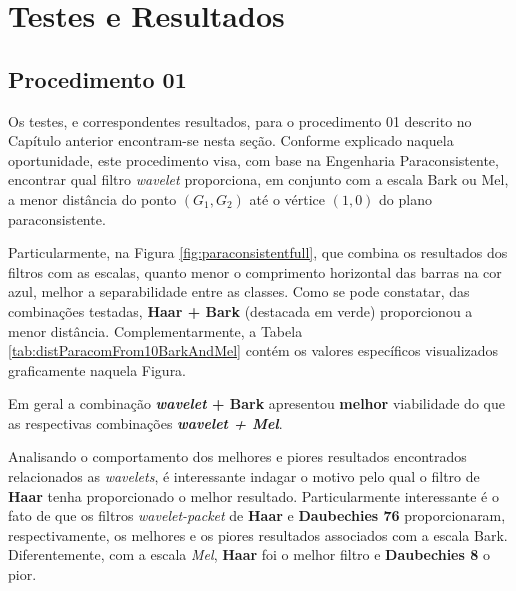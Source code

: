\chapter{Testes e Resultados} \label{chap:testsResults}
	\section{Procedimento 01}
	\label{chap:testsResults:sec:Experimento01}
	Os testes, e correspondentes resultados, para o procedimento 01 descrito no Capítulo anterior encontram-se nesta seção. Conforme explicado naquela oportunidade, este procedimento visa, com base na Engenharia Paraconsistente, encontrar qual filtro \textit{wavelet} proporciona, em conjunto com a escala Bark ou Mel, a menor distância do ponto $(G_1,G_2)$ até o vértice $(1,0)$ do plano paraconsistente.\\

	\par Particularmente, na Figura \ref{fig:paraconsistentfull}, que combina os resultados dos filtros com as escalas, quanto menor o comprimento horizontal das barras na cor azul, melhor a separabilidade entre as classes. Como se pode constatar, das combinações testadas, \textbf{Haar + Bark} (destacada em verde) proporcionou a menor distância. Complementarmente, a Tabela \ref{tab:distParacomFrom10BarkAndMel} contém os valores específicos visualizados graficamente naquela Figura.\\
	
	\par Em geral a combinação \textbf{\textit{wavelet} + Bark} apresentou \textbf{melhor} viabilidade do que as respectivas combinações \textbf{\textit{wavelet + Mel}}.\\

	

	\par Analisando o comportamento dos melhores e piores resultados encontrados relacionados as \textit{wavelets}, é interessante indagar o motivo pelo qual o filtro de \textbf{Haar} tenha proporcionado o melhor resultado. Particularmente interessante é o fato de que os filtros \textit{wavelet-packet} de \textbf{Haar} e \textbf{Daubechies 76} proporcionaram, respectivamente, os melhores e os piores resultados associados com a escala Bark. Diferentemente, com a escala \textit{Mel}, \textbf{Haar} foi o melhor filtro e \textbf{Daubechies 8} o pior. \\
	
